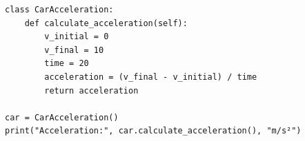 \begin{verbatim}
class CarAcceleration:
    def calculate_acceleration(self):
        v_initial = 0
        v_final = 10
        time = 20
        acceleration = (v_final - v_initial) / time
        return acceleration

car = CarAcceleration()
print("Acceleration:", car.calculate_acceleration(), "m/s²")
\end{verbatim}